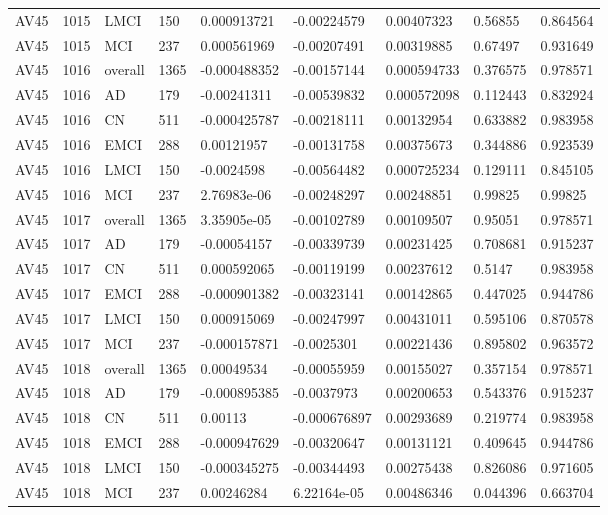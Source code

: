 \begin{landscape}
\begin{longtable}{lllllllll}
AV45 & 1015 & LMCI & 150 & 0.000913721 & -0.00224579 & 0.00407323 & 0.56855 & 0.864564 \\
AV45 & 1015 & MCI & 237 & 0.000561969 & -0.00207491 & 0.00319885 & 0.67497 & 0.931649 \\
AV45 & 1016 & overall & 1365 & -0.000488352 & -0.00157144 & 0.000594733 & 0.376575 & 0.978571 \\
AV45 & 1016 & AD & 179 & -0.00241311 & -0.00539832 & 0.000572098 & 0.112443 & 0.832924 \\
AV45 & 1016 & CN & 511 & -0.000425787 & -0.00218111 & 0.00132954 & 0.633882 & 0.983958 \\
AV45 & 1016 & EMCI & 288 & 0.00121957 & -0.00131758 & 0.00375673 & 0.344886 & 0.923539 \\
AV45 & 1016 & LMCI & 150 & -0.0024598 & -0.00564482 & 0.000725234 & 0.129111 & 0.845105 \\
AV45 & 1016 & MCI & 237 & 2.76983e-06 & -0.00248297 & 0.00248851 & 0.99825 & 0.99825 \\
AV45 & 1017 & overall & 1365 & 3.35905e-05 & -0.00102789 & 0.00109507 & 0.95051 & 0.978571 \\
AV45 & 1017 & AD & 179 & -0.00054157 & -0.00339739 & 0.00231425 & 0.708681 & 0.915237 \\
AV45 & 1017 & CN & 511 & 0.000592065 & -0.00119199 & 0.00237612 & 0.5147 & 0.983958 \\
AV45 & 1017 & EMCI & 288 & -0.000901382 & -0.00323141 & 0.00142865 & 0.447025 & 0.944786 \\
AV45 & 1017 & LMCI & 150 & 0.000915069 & -0.00247997 & 0.00431011 & 0.595106 & 0.870578 \\
AV45 & 1017 & MCI & 237 & -0.000157871 & -0.0025301 & 0.00221436 & 0.895802 & 0.963572 \\
AV45 & 1018 & overall & 1365 & 0.00049534 & -0.00055959 & 0.00155027 & 0.357154 & 0.978571 \\
AV45 & 1018 & AD & 179 & -0.000895385 & -0.0037973 & 0.00200653 & 0.543376 & 0.915237 \\
AV45 & 1018 & CN & 511 & 0.00113 & -0.000676897 & 0.00293689 & 0.219774 & 0.983958 \\
AV45 & 1018 & EMCI & 288 & -0.000947629 & -0.00320647 & 0.00131121 & 0.409645 & 0.944786 \\
AV45 & 1018 & LMCI & 150 & -0.000345275 & -0.00344493 & 0.00275438 & 0.826086 & 0.971605 \\
AV45 & 1018 & MCI & 237 & 0.00246284 & 6.22164e-05 & 0.00486346 & 0.044396 & 0.663704 \\

\end{longtable}
\end{landscape}
